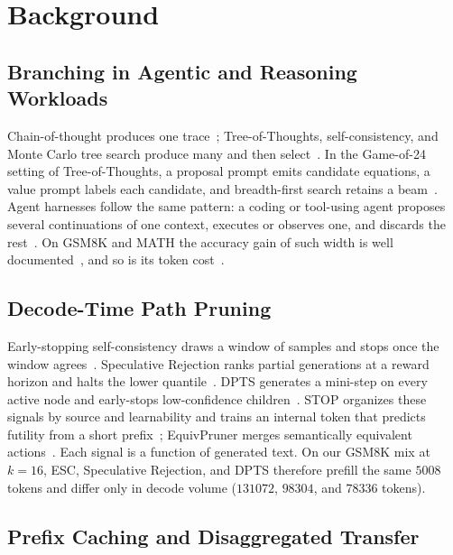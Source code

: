 \section{Background}
\label{sec:bg-full}

\subsection{Branching in Agentic and Reasoning Workloads}
\label{sec:bg-search}

Chain-of-thought produces one trace~\cite{cot}; Tree-of-Thoughts, self-consistency, and Monte Carlo tree search produce many and then select~\cite{tot,selfconsistency,mctsllm}.
In the Game-of-24 setting of Tree-of-Thoughts, a proposal prompt emits candidate equations, a value prompt labels each candidate, and breadth-first search retains a beam~\cite{tot}.
Agent harnesses follow the same pattern: a coding or tool-using agent proposes several continuations of one context, executes or observes one, and discards the rest~\cite{react,sweagent,openhands}.
On GSM8K and MATH the accuracy gain of such width is well documented~\cite{gsm8k,math,math500}, and so is its token cost~\cite{equivpruner,stoploss}.

\subsection{Decode-Time Path Pruning}
\label{sec:bg-prune}

Early-stopping self-consistency draws a window of samples and stops once the window agrees~\cite{esc,selfconsistency}.
Speculative Rejection ranks partial generations at a reward horizon and halts the lower quantile~\cite{specrej}.
DPTS generates a mini-step on every active node and early-stops low-confidence children~\cite{dpts}.
STOP organizes these signals by source and learnability and trains an internal token that predicts futility from a short prefix~\cite{stoploss}; EquivPruner merges semantically equivalent actions~\cite{equivpruner}.
Each signal is a function of generated text.
On our GSM8K mix at $k{=}16$, ESC, Speculative Rejection, and DPTS therefore prefill the same $5008$ tokens and differ only in decode volume ($131072$, $98304$, and $78336$ tokens).

\subsection{Prefix Caching and Disaggregated Transfer}
\label{sec:bg-pd}

